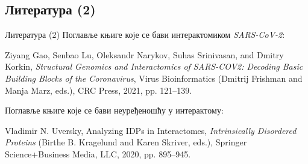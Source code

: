 \documentclass[hyperref={bookmarks=false}]{beamer}
\begin{document}
\subsection{Литература (2)}
\begin{frame}{Литература (2)}
Поглавље књиге које се бави интерактомиком \textit{SARS-CoV-2}:
\begin{thebibliography}{1}
\bibitem{} Ziyang Gao, Senbao Lu, Oleksandr Narykov, Suhas Srinivasan, and Dmitry Korkin, \textit{Structural Genomics and Interactomics of SARS-COV2: Decoding Basic Building Blocks of the Coronavirus}, Virus Bioinformatics (Dmitrij Frishman and Manja Marz, eds.), CRC Press, 2021, pp. 121–139.
\end{thebibliography}

\bigskip

Поглавље књиге које се бави неуређеношћу у интерактому:
\begin{thebibliography}{1}
\bibitem{} Vladimir N. Uversky, Analyzing IDPs in Interactomes, \textit{Intrinsically Disordered Proteins} (Birthe B. Kragelund and Karen Skriver, eds.), Springer Science+Business Media, LLC, 2020, pp. 895–945.
\end{thebibliography}
\end{frame}
\end{document}
